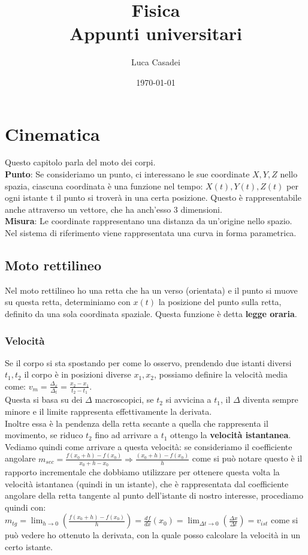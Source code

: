 \documentclass[a4paper,12pt]{report}
\title{\textbf{Fisica}\\Appunti universitari}
\author{Luca Casadei}
\date{\today}
\begin{document}
	\maketitle
	\tableofcontents
	\chapter{Cinematica}
	Questo capitolo parla del moto dei corpi.\\
	\textbf{Punto}: Se consideriamo un punto, ci interessano le sue coordinate ${X,Y,Z}$ nello spazia, ciascuna coordinata è una funzione nel tempo:
	${X(t),Y(t),Z(t)}$ per ogni istante t il punto si troverà in una certa posizione. Questo è rappresentabile anche attraverso un vettore, che ha anch'esso 3 dimensioni.\\
	\textbf{Misura}: Le coordinate rappresentano una distanza da un'origine nello spazio.
	Nel sistema di riferimento viene rappresentata una curva in forma parametrica.
	\section{Moto rettilineo}
	Nel moto rettilineo ho una retta che ha un verso (orientata) e il punto si muove su questa retta, determiniamo con ${x(t)}$ la posizione del punto sulla retta, definito da una sola coordinata spaziale. Questa funzione è detta \textbf{legge oraria}.
	\subsection{Velocità}
	Se il corpo si sta spostando per come lo osservo, prendendo due istanti diversi ${t_1,t_2}$ il corpo è in posizioni diverse ${x_1,x_2}$, possiamo definire la velocità media come: ${v_m = \frac{\Delta_x}{\Delta_t} = \frac{x_2 - x_1}{t_2 - t_1}}$.\\
	Questa si basa su dei ${\Delta}$ macroscopici, se ${t_2}$ si avvicina a ${t_1}$, il ${\Delta}$ diventa sempre minore e il limite rappresenta effettivamente la derivata.\\
	Inoltre essa è la pendenza della retta secante a quella che rappresenta il movimento, se riduco $t_2$ fino ad arrivare a $t_1$ ottengo la \textbf{velocità istantanea}.\\
	Vediamo quindi come arrivare a questa velocità: se consideriamo il coefficiente angolare $m_{sec} = {{\frac{f(x_0 + h) - f(x_0)}{x_0 + h - x_0}} \Rightarrow {\frac{(x_0 + h) - f(x_0)}{h}}}$ come si può notare questo è il rapporto incrementale che dobbiamo utilizzare per ottenere questa volta la velocità istantanea (quindi in un istante), che è rappresentata dal coefficiente angolare della retta tangente al punto dell'istante di nostro interesse, procediamo quindi con: $m_{tg} = {\lim_{h\to0}(\frac{f(x_0 + h) - f(x_0)}{h})} = {\frac{df}{dx}(x_0)} = {\lim_{\Delta t\to0}(\frac{\Delta x}{\Delta t})} = v_{ist}$ come si può vedere ho ottenuto la derivata, con la quale posso calcolare la velocità in un certo istante.
\end{document}

